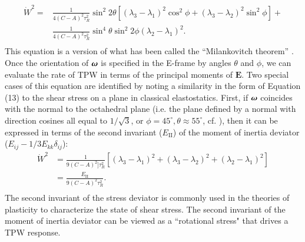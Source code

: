 \documentclass[preprint,12pt,authoryear]{elsarticle}
\newcommand{\mitbf}[1]{\hbox{\mathversion{bold}$#1$}}
\begin{document}
\begin{equation}
\begin{aligned}
\dot{W}^2 = 
&\frac{1}{4(C-A)^2 \tau_R^2}\sin^2{2\theta} \left[( \lambda_3 - \lambda_1)^2 \cos^2{\phi} + (\lambda_3 - \lambda_2)^2 \sin^2{\phi} \right] +\\
&\frac{1}{4(C-A)^2 \tau_R^2}\sin^4{\theta} \sin^2{2\phi}\left( \lambda_2 - \lambda_1 \right)^2. \\
\label{eq:polar_wander_rate}
\end{aligned}
\end{equation}
This equation is a version of what has been called the ``Milankovitch theorem'' \citep{munk1960rotation}. Once the orientation of $\mitbf{\omega}$ is specified in the E-frame by angles $\theta$ and $\phi$, we can evaluate the rate of TPW in terms of the principal moments of $\mathbf{E}$.
Two special cases of this equation are identified by noting a similarity in the form of Equation (13) to the shear stress on a plane in classical elastostatics. First, if $\mitbf{\omega}$  coincides with  the normal to the octahedral plane
(i.e. the plane defined by a normal with direction cosines all equal to $1/\sqrt{3}$, or $\phi=45^\circ, \theta\approx 55^\circ$, cf. \citet{fung1965foundations}), 
then it can be expressed in terms of the second invariant ($E_{\mathrm{II}}$) of the moment of inertia deviator 
($E_{ij} - 1/3 E_{kk} \delta_{ij}$):
\begin{equation}
\begin{aligned}
\dot{W}^2
  &= \frac{1}{9(C-A)^2 ]\tau_R^2}\left[( \lambda_3 - \lambda_1)^2 + (\lambda_3 - \lambda_2)^2 + (\lambda_2 - \lambda_1)^2 \right]\\
  &= \frac{E_{\mathrm{II}}}{9(C-A)^2 \tau_R^2}. \\
\end{aligned}
\end{equation}
The second invariant of the stress deviator is commonly used in the theories of plasticity
to characterize the state of shear stress.
The second invariant of the moment of inertia deviator can be viewed as a ``rotational stress" that drives a TPW response. 
\end{document}
